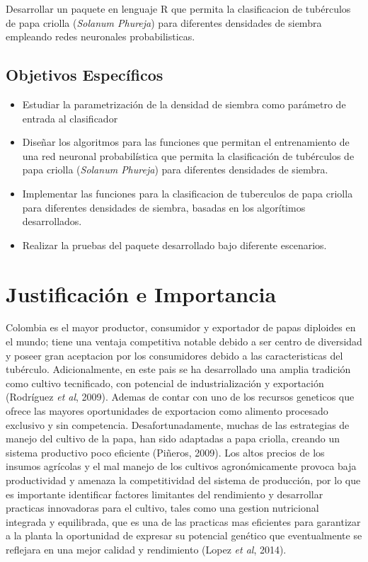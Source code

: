 Desarrollar un paquete en lenguaje R que permita la clasificacion de tubérculos de papa criolla (\textit{Solanum Phureja}) para diferentes densidades de siembra empleando redes neuronales probabilisticas.

\subsection{Objetivos Espec\'ificos}
 
\begin{itemize}
\item{Estudiar la parametrizaci\'on de la densidad de siembra como par\'ametro de entrada al clasificador}
\item{Diseñar los algoritmos para las funciones que permitan el entrenamiento de una red neuronal probabilística que permita la clasificación de tubérculos de papa criolla (\textit{Solanum Phureja}) para diferentes densidades de siembra.}
\item{Implementar las funciones  para la clasificacion de tuberculos de papa criolla para diferentes densidades de siembra, basadas en los algorítimos desarrollados.}
\item{Realizar la pruebas del paquete desarrollado bajo diferente escenarios.}
\end{itemize}

\section{Justificaci\'on e Importancia}

Colombia es el mayor productor, consumidor y exportador de papas diploides en el mundo; tiene una ventaja competitiva notable debido a ser centro de diversidad y poseer gran aceptacion por los consumidores debido a las caracteristicas del tubérculo. Adicionalmente, en este pais se ha desarrollado una amplia tradición como cultivo tecnificado, con potencial de industrialización y exportación (Rodríguez \textit{et al}, 2009). Ademas de contar con uno de los recursos geneticos que ofrece las mayores oportunidades de exportacion como alimento procesado exclusivo y sin competencia. Desafortunadamente, muchas de las estrategias de manejo del cultivo de la papa, han sido adaptadas a papa criolla, creando un sistema productivo poco eficiente (Piñeros, 2009). Los altos precios de los insumos agrícolas y el mal manejo de los cultivos agronómicamente provoca  baja productividad y amenaza la competitividad del sistema de producción, por lo que es importante identificar factores limitantes del rendimiento y desarrollar practicas innovadoras para el cultivo, tales como una gestion nutricional integrada y equilibrada, que es una de las practicas mas eficientes para garantizar a la planta la oportunidad de expresar su potencial genético que eventualmente se reflejara en una mejor calidad y rendimiento (Lopez \textit{et al}, 2014).\\
 
